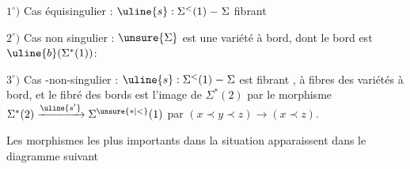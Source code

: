 $1^{\circ})$ Cas équisingulier : $\uline{s}:\Sigma^{<}(1)\mathrel{-}\Sigma$ fibrant 

$2^{\circ})$ Cas non singulier : $\unsure{\Sigma}$ est une variété à bord,
dont le bord est $\uline{b}(\Sigma^{*}(1))$:

$3^{\circ})$ Cas -non-singulier : $\uline{s}:\Sigma^{<}(1)\mathrel{-}\Sigma$ est
fibrant , à fibres des variétés à bord, et le
fibré des bords est l'image de $\Sigma^{*}(2)$ par
le morphisme $\Sigma^{*}(2)\xrightarrow{\uline{s'}}\Sigma^{\unsure{*|<}}(1)$ 
par $(x\prec y\prec z)\longrightarrow(x\prec z)$.

Les morphismes les plus importants dans la
situation apparaissent dans le diagramme
 suivant
